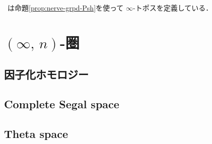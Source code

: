 \documentclass[TQFT_main]{subfiles}
\begin{document}
~\cite{alfonsi2023higher}は命題\ref{prop:nerve-grpd-Psh}を使って $\infty$-トポスを定義している．


\section{$(\infty,\, n)$-圏}

\subsection{因子化ホモロジー}

\subsection{Complete Segal space}

\subsection{Theta space}
\end{document}
